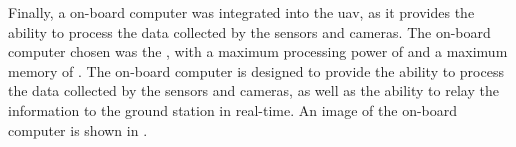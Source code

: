 
Finally, a on-board computer was integrated into the \gls{uav}, as it provides the ability to process the data collected by the sensors and cameras. The on-board computer chosen was the , with a maximum processing power of  and a maximum memory of . The on-board computer is designed to provide the ability to process the data collected by the sensors and cameras, as well as the ability to relay the information to the ground station in real-time. An image of the on-board computer is shown in .

